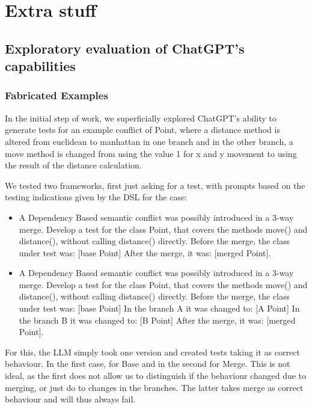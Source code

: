 \chapter{Extra stuff} \label{ap1:Lorem}

\section{Exploratory evaluation of ChatGPT's capabilities}

\subsection{Fabricated Examples}

In the initial step of work, we superficially explored ChatGPT's ability to generate tests for an example conflict of Point, where a distance method is altered from euclidean to manhattan in one branch and in the other branch, a move method is changed from using the value 1 for x and y movement to using the result of the distance calculation.

We tested two frameworks, first just asking for a test, with prompts based on the testing indications given by the DSL for the case:

\begin{itemize}
  \item A Dependency Based semantic conflict was possibly introduced in a 3-way merge. Develop a test for the class Point, that covers the methods move() and distance(), without calling distance() directly.
Before the merge, the class under test was: [base Point]
After the merge, it was: [merged Point].
  \item A Dependency Based semantic conflict was possibly introduced in a 3-way merge. Develop a test for the class Point, that covers the methods move() and distance(), without calling distance() directly.
Before the merge, the class under test was: [base Point]
In the branch A it was changed to: [A Point]
In the branch B it was changed to: [B Point]
After the merge, it was: [merged Point].

\end{itemize}

For this, the LLM simply took one version and created tests taking it as correct behaviour. In the first case, for Base and in the second for Merge. This is not ideal, as the first does not allow us to distinguish if the behaviour changed due to merging, or just do to changes in the branches. The latter takes merge as correct behaviour and will thus always fail.

